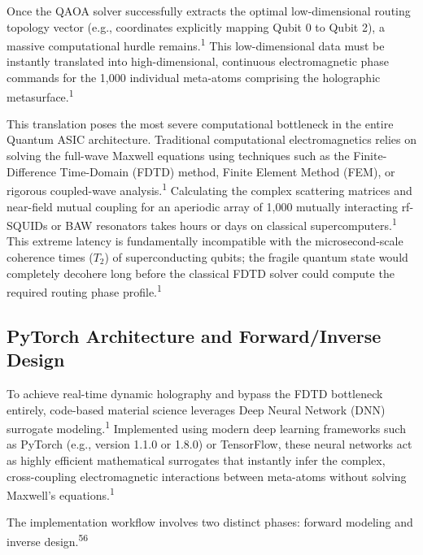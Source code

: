 \documentclass[11pt, a4paper]{article}
\begin{document}
Once the QAOA solver successfully extracts the optimal low-dimensional routing topology vector (e.g., coordinates explicitly mapping Qubit 0 to Qubit 2), a massive computational hurdle remains.\textsuperscript{1} This low-dimensional data must be instantly translated into high-dimensional, continuous electromagnetic phase commands for the 1,000 individual meta-atoms comprising the holographic metasurface.\textsuperscript{1}

This translation poses the most severe computational bottleneck in the entire Quantum ASIC architecture. Traditional computational electromagnetics relies on solving the full-wave Maxwell equations using techniques such as the Finite-Difference Time-Domain (FDTD) method, Finite Element Method (FEM), or rigorous coupled-wave analysis.\textsuperscript{1} Calculating the complex scattering matrices and near-field mutual coupling for an aperiodic array of 1,000 mutually interacting rf-SQUIDs or BAW resonators takes hours or days on classical supercomputers.\textsuperscript{1} This extreme latency is fundamentally incompatible with the microsecond-scale coherence times ($T_2$) of superconducting qubits; the fragile quantum state would completely decohere long before the classical FDTD solver could compute the required routing phase profile.\textsuperscript{1}

\subsection{PyTorch Architecture and Forward/Inverse Design}

To achieve real-time dynamic holography and bypass the FDTD bottleneck entirely, code-based material science leverages Deep Neural Network (DNN) surrogate modeling.\textsuperscript{1} Implemented using modern deep learning frameworks such as PyTorch (e.g., version 1.1.0 or 1.8.0) or TensorFlow, these neural networks act as highly efficient mathematical surrogates that instantly infer the complex, cross-coupling electromagnetic interactions between meta-atoms without solving Maxwell's equations.\textsuperscript{1}

The implementation workflow involves two distinct phases: forward modeling and inverse design.\textsuperscript{56}
\end{document}
